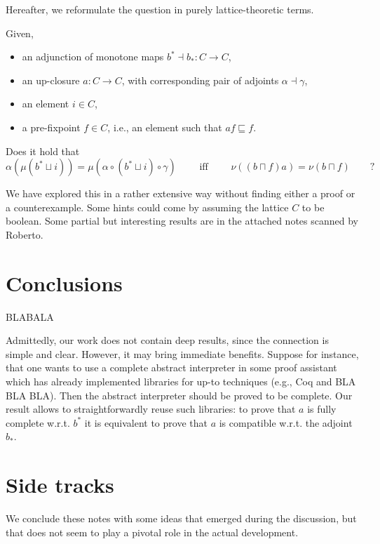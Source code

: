 \documentclass{llncs}
\begin{document}
Hereafter, we reformulate the question in purely lattice-theoretic terms.

\medskip

Given, 
\begin{itemize}
\item an adjunction of monotone maps $b^*\dashv b_* \colon C\to C$,
\item an up-closure $a\colon C \to C$, with corresponding pair of adjoints $\alpha \dashv \gamma$,
\item an element $i\in C$,
\item a pre-fixpoint $f\in C$, i.e., an element such that $af \sqsubseteq f$.
\end{itemize}
Does it hold that
$$\alpha (\mu(b^* \sqcup i)) = \mu (\alpha \circ  (b^* \sqcup i) \circ \gamma ) \qquad  \text{ iff } \qquad \nu((b\sqcap f)a) = \nu( b \sqcap f) \qquad \text{?}$$


We have explored this in a rather extensive way without finding either a proof or a counterexample. Some hints could come by assuming the lattice $C$ to be boolean.
Some partial but interesting results are in the attached notes scanned by Roberto.


\section{Conclusions}
BLABALA

Admittedly, our work does not contain deep results, since the connection is simple and clear. However, it may bring immediate benefits. Suppose for instance, that one wants to use a complete abstract interpreter in some proof assistant which has already implemented libraries for up-to techniques (e.g., Coq\cite{} and BLA BLA BLA). Then the abstract interpreter should be proved to be complete. Our result allows to straightforwardly reuse such libraries: to prove that $a$ is fully complete w.r.t. $b^*$ it is equivalent to prove that $a$ is compatible w.r.t. the adjoint $b_*$.






%


\section{Side tracks}
We conclude these notes with some ideas that emerged during the discussion, but that does not seem to play a pivotal role in the actual development.
\end{document}
